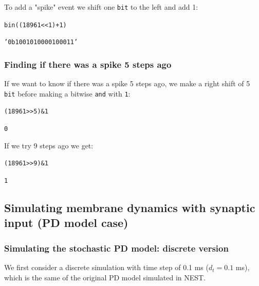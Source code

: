 \documentclass[11pt]{scrartcl}
\renewenvironment{verbatim}{\begin{alltt} \scriptsize \color{Bittersweet} \vspace{0.2cm} }{\vspace{0.2cm} \end{alltt} \normalsize \color{black}}
\begin{document}
To add a "spike" event we shift one \texttt{bit} to the left and add 1:

\begin{verbatim}
bin((18961 << 1)+1)
\end{verbatim}

\begin{verbatim}
'0b1001010000100011'
\end{verbatim}

\subsubsection{Finding if there was a spike 5 steps ago}
\label{sec:org4f7ee0a}
If we want to know if there was a spike 5 steps ago, we make a right shift of 5 \texttt{bit} before making a bitwise \texttt{and} with \texttt{1}:

\begin{verbatim}
(18961 >> 5) & 1
\end{verbatim}

\begin{verbatim}
0
\end{verbatim}



If we try 9 steps ago we get:

\begin{verbatim}
(18961 >> 9) & 1
\end{verbatim}

\begin{verbatim}
1
\end{verbatim}


\subsection{Simulating membrane dynamics with synaptic input (PD model case)}
\label{sec:org1cd5277}

\subsubsection{Simulating the stochastic PD model: discrete version}
\label{sec:org4787dcf}

We first consider a discrete simulation with time step of 0.1 ms (\(d_t = 0.1\) ms), which is the same of the original PD model simulated in NEST.
\end{document}
